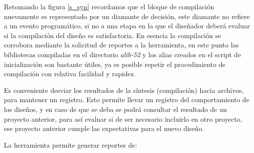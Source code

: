 Retomando la figura \ref{s_syn} recordamos que el bloque de compilación nuevamente es representado por un diamante de decisión, este diamante no refiere a un evento programático, si no a una etapa en la que el diseñador deberá evaluar si la compilación del diseño es satisfactoria. En esencia la compilación se corrobora mediante la solicitud de reportes a la herramienta, en este punto las bibliotecas compiladas en el directorio \textit{alib-52} y los alias creados en el script de inicialización son bastante útiles, ya es posible repetir el procedimiento de compilación con relativa facilidad y rapidez.

Es conveniente desviar los resultados de la síntesis (compilación) hacia archivos, para mantener un registro. Esto permite llevar un registro del comportamiento de los diseños, y en caso de que se deba se podrá consultar el resultado de un proyecto anterior, para así evaluar si de ser necesario incluirlo en otro proyecto, ese proyecto anterior cumple las expectativas para el nuevo diseño.

La herramienta permite generar reportes de:

